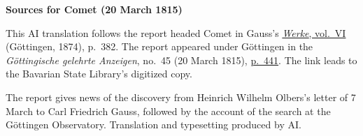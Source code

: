 \clearpage\thispagestyle{empty}
\begin{center}\textbf{Sources for Comet (20 March 1815)}\end{center}
\noindent This AI translation follows the report headed Comet in Gauss’s \href{https://gdz.sub.uni-goettingen.de/id/PPN236007467}{\textit{Werke}, vol.~VI} (Göttingen, 1874), p.~382. The report appeared under Göttingen in the \textit{Göttingische gelehrte Anzeigen}, no.~45 (20 March 1815), \href{https://api.digitale-sammlungen.de/iiif/image/v2/bsb10538686_00449/full/1600,/0/default.jpg}{p.~441}. The link leads to the Bavarian State Library’s digitized copy.
\par\smallskip\noindent The report gives news of the discovery from Heinrich Wilhelm Olbers’s letter of 7 March to Carl Friedrich Gauss, followed by the account of the search at the Göttingen Observatory. Translation and typesetting produced by AI.
\clearpage
